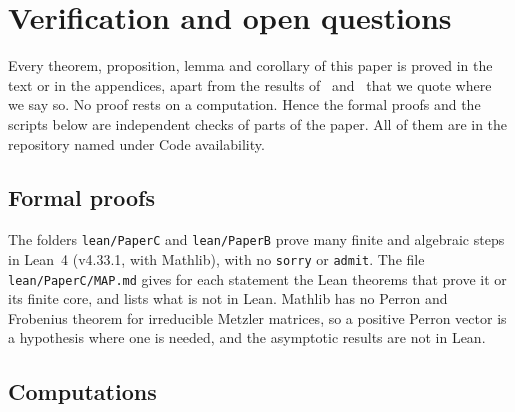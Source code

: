\section{Verification and open questions}\label{sec:verify}

Every theorem, proposition, lemma and corollary of this paper is proved in the
text or in the appendices, apart from the results of\ifarxivbuild~\cite{paperA}
and\fi~\cite{paperB} that we quote where we say so. No proof rests on a
computation. Hence the formal proofs and the scripts below are independent checks of parts of the paper. All of them are in the repository named under Code availability.

\subsection*{Formal proofs}

The folders \nolinkurl{lean/PaperC} and \nolinkurl{lean/PaperB} prove many finite
and algebraic steps in Lean~4 (v4.33.1, with Mathlib), with no \texttt{sorry} or
\texttt{admit}. The file \nolinkurl{lean/PaperC/MAP.md} gives for each statement the Lean theorems
that prove it or its finite core, and lists what is not in Lean. Mathlib has no Perron and Frobenius theorem for irreducible Metzler
matrices, so a positive Perron vector is a hypothesis where one is
needed, and the asymptotic results are not in Lean.

\subsection*{Computations}

